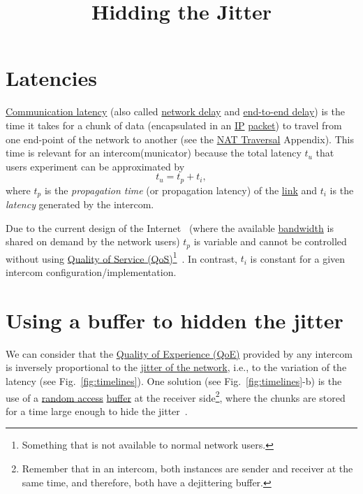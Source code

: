 
\title{Hidding the Jitter}

\maketitle
\tableofcontents

\section{Latencies}
\href{https://en.wikipedia.org/wiki/Latency_(engineering)#Communication_latency}{Communication
  latency} (also called
\href{https://en.wikipedia.org/wiki/Network_delay}{network delay} and
\href{https://en.wikipedia.org/wiki/End-to-end_delay}{end-to-end
  delay}) is the time it takes for a chunk of data (encapsulated in an
\href{https://en.wikipedia.org/wiki/Internet_Protocol}{IP}
\href{https://en.wikipedia.org/wiki/Network_packet}{packet}) to travel
from one end-point of the network to another (see the
\href{https://tecnologias-multimedia.github.io/contents/NAT_traversal/}{NAT
  Traversal} Appendix). This time is relevant for an intercom(municator)
because the total latency $t_u$ that users experiment can be
approximated by
\begin{equation}
  t_u = t_p + t_i,
  \label{eq:user_latency}
\end{equation}
where $t_p$ is the \emph{propagation time} (or propagation latency) of
the \href{https://en.wikipedia.org/wiki/Telecommunications_link}{link}
and $t_i$ is the \emph{latency} generated by the intercom.

Due to the current design of the Internet~\cite{Tanenbaum,Stallings}
(where the available
\href{https://en.wikipedia.org/wiki/Bandwidth_(computing)}{bandwidth}
is shared on demand by the network users) $t_p$ is variable
and cannot be controlled without using
\href{https://en.wikipedia.org/wiki/Quality_of_service}{Quality of
  Service (QoS)}\footnote{Something that is not available to normal
network users.}~\cite{dordal2020intro}. In contrast, $t_i$ is constant
for a given intercom configuration/implementation.

\section{Using a buffer to hidden the jitter}

We can consider that the
\href{https://en.wikipedia.org/wiki/Quality_of_experience}{Quality of
  Experience (QoE)} provided by any intercom is inversely proportional
to the
\href{https://en.wikipedia.org/wiki/Packet_delay_variation}{jitter of
  the network}, i.e., to the variation of the latency (see
Fig.~\ref{fig:timelines}). One solution (see
Fig.~\ref{fig:timelines}-b) is the use of a
\href{https://en.wikipedia.org/wiki/Random_access}{random access}
\href{https://en.wikipedia.org/wiki/Data_buffer}{buffer} at the
receiver side\footnote{Remember that in an intercom, both instances
  are sender and receiver at the same time, and therefore, both have a
  dejittering buffer.}, where the chunks are stored for a time large
enough to hide the jitter~\cite{Kurose-Ross}.

